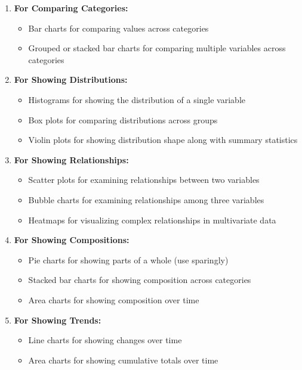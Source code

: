 \documentclass[
  letterpaper,
]{book}
\providecommand{\tightlist}{%
  \setlength{\itemsep}{0pt}\setlength{\parskip}{0pt}}
\begin{document}
\begin{enumerate}
\def\labelenumi{\arabic{enumi}.}
\tightlist
\item
  \textbf{For Comparing Categories:}

  \begin{itemize}
  \tightlist
  \item
    Bar charts for comparing values across categories
  \item
    Grouped or stacked bar charts for comparing multiple variables
    across categories
  \end{itemize}
\item
  \textbf{For Showing Distributions:}

  \begin{itemize}
  \tightlist
  \item
    Histograms for showing the distribution of a single variable
  \item
    Box plots for comparing distributions across groups
  \item
    Violin plots for showing distribution shape along with summary
    statistics
  \end{itemize}
\item
  \textbf{For Showing Relationships:}

  \begin{itemize}
  \tightlist
  \item
    Scatter plots for examining relationships between two variables
  \item
    Bubble charts for examining relationships among three variables
  \item
    Heatmaps for visualizing complex relationships in multivariate data
  \end{itemize}
\item
  \textbf{For Showing Compositions:}

  \begin{itemize}
  \tightlist
  \item
    Pie charts for showing parts of a whole (use sparingly)
  \item
    Stacked bar charts for showing composition across categories
  \item
    Area charts for showing composition over time
  \end{itemize}
\item
  \textbf{For Showing Trends:}

  \begin{itemize}
  \tightlist
  \item
    Line charts for showing changes over time
  \item
    Area charts for showing cumulative totals over time
  \end{itemize}
\end{enumerate}
\end{document}
